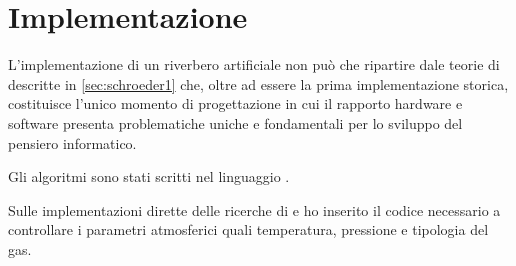 
\chapter{Implementazione}
\label{chp:Implementazione}

L'implementazione di un riverbero artificiale non può che ripartire dale teorie
di \ms descritte in \ref{sec:schroeder1} che, oltre ad essere la prima
implementazione storica, costituisce l'unico momento di progettazione in cui
il rapporto hardware e software presenta problematiche uniche e fondamentali per
lo sviluppo del pensiero informatico.

Gli algoritmi sono stati scritti nel linguaggio \faust.

Sulle implementazioni dirette delle ricerche di \ms e \jam ho inserito il codice
necessario a controllare i parametri atmosferici quali temperatura, pressione e
tipologia del gas.

\clearpage

\clearpage

\clearpage

